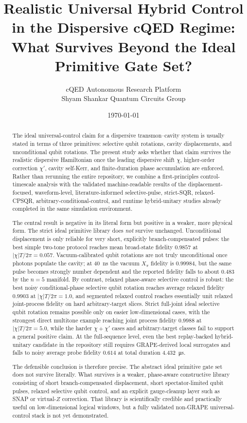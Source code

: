 \documentclass[11pt]{article}
\title{\textbf{Realistic Universal Hybrid Control in the Dispersive cQED Regime:\\
What Survives Beyond the Ideal Primitive Gate Set?}}
\author{cQED Autonomous Research Platform \\ Shyam Shankar Quantum Circuits Group}
\date{\today}
\begin{document}
\maketitle

\begin{abstract}
The ideal universal-control claim for a dispersive transmon--cavity system is usually stated in terms of three primitives: selective qubit rotations, cavity displacements, and unconditional qubit rotations. The present study asks whether that claim survives the realistic dispersive Hamiltonian once the leading dispersive shift $\chi$, higher-order correction $\chi'$, cavity self-Kerr, and finite-duration phase accumulation are enforced. Rather than rerunning the entire repository, we combine a first-principles control-timescale analysis with the validated machine-readable results of the displacement-focused, waveform-level, literature-informed selective-pulse, strict-SQR, relaxed-CPSQR, arbitrary-conditional-control, and runtime hybrid-unitary studies already completed in the same simulation environment.

The central result is negative in its literal form but positive in a weaker, more physical form. The strict ideal primitive library does \emph{not} survive unchanged. Unconditional displacement is only reliable for very short, explicitly branch-compensated pulses: the best simple two-tone protocol reaches mean broad-state fidelity $0.9857$ at $|\chi|T/2\pi=0.057$. Vacuum-calibrated qubit rotations are not truly unconditional once photons populate the cavity; at \SI{40}{ns} the vacuum $X_\pi$ fidelity is $0.99984$, but the same pulse becomes strongly number dependent and the reported fidelity falls to about $0.483$ by the $n=5$ manifold. By contrast, relaxed phase-aware selective control is robust: the best noisy conditional-phase selective qubit rotation reaches average relaxed fidelity $0.9903$ at $|\chi|T/2\pi=1.0$, and segmented relaxed control reaches essentially unit relaxed joint-process fidelity on hard arbitrary-target slices. Strict full-joint ideal selective qubit rotation remains possible only on easier low-dimensional cases, with the strongest direct multitone example reaching joint process fidelity $0.9988$ at $|\chi|T/2\pi=5.0$, while the harder $\chi+\chi'$ cases and arbitrary-target classes fail to support a general positive claim. At the full-sequence level, even the best replay-backed hybrid-unitary candidate in the repository still requires GRAPE-derived local surrogates and falls to noisy average probe fidelity $0.614$ at total duration \SI{4.432}{\micro s}.

The defensible conclusion is therefore precise. The abstract ideal primitive gate set does not survive literally. What survives is a weaker, phase-aware constructive library consisting of short branch-compensated displacement, short spectator-limited qubit pulses, relaxed selective qubit control, and an explicit gauge-cleanup layer such as SNAP or virtual-$Z$ correction. That library is scientifically credible and practically useful on low-dimensional logical windows, but a fully validated non-GRAPE universal-control stack is not yet demonstrated.
\end{abstract}
\end{document}
